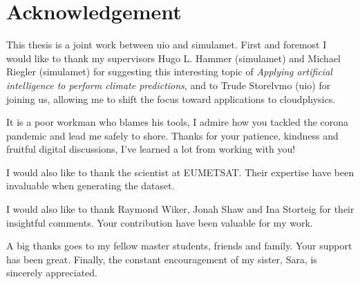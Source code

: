 \chapter*{Acknowledgement}
This thesis is a joint work between \acrfull{uio} and \acrfull{simulamet}. First and foremost I would like to thank my supervisors Hugo L. Hammer (\acrshort{simulamet}) and Michael Riegler (\acrshort{simulamet}) for suggesting this interesting topic of \textit{Applying artificial intelligence to perform climate predictions}, and to Trude Storelvmo (\acrshort{uio}) for joining us, allowing me to shift the focus toward applications to cloudphysics.

It is a poor workman who blames his tools, I admire how you tackled the corona pandemic and lead me safely to shore. Thanks for your patience, kindness and fruitful digital discussions, I've learned a lot from working with you!

I would also like to thank the scientist at EUMETSAT. 
Their expertise have been invaluable when generating the dataset. 

I would also like to thank Raymond Wiker, Jonah Shaw and Ina Storteig for their %
insightful comments. Your contribution have been valuable for my work.

A big thanks goes to my fellow master students, friends and family. Your support has been great. Finally, the constant encouragement of my sister, Sara, is sincerely appreciated.
\cleardoublepage